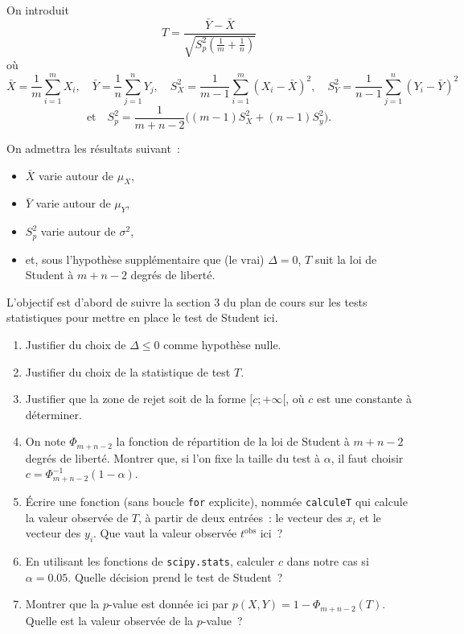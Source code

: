 \documentclass[a4paper,12pt,twosided]{article}
\newcommand{\ds}{\displaystyle}
\theoremstyle{definition}
\begin{document}
On introduit
\begin{equation}\label{eq:T}
  T = \frac{\ds \bar Y - \bar X}{\ds \sqrt{S_p^2\left(\frac1m+\frac1n\right)}}
\end{equation}
où
\[
  \bar X = \frac1m\sum_{i=1}^m X_i, \quad \bar Y = \frac1n \sum_{j=1}^n Y_j,
  \quad
  S_X^2 = \frac1{m-1}\sum_{i=1}^m (X_i- \bar X)^2, \quad S_Y^2 = \frac1{n-1}\sum_{j=1}^n (Y_i- \bar Y)^2
\]
\[
  \text{et} \quad S_p^2 = \frac{1}{m+n-2}\Big( (m-1)S_X^2 + (n-1)S_y^2 \Big).
\]

On admettra les résultats suivant~:
\begin{itemize}
\item $\bar X$ varie autour de $\mu_X$,
\item $\bar Y$ varie autour de $\mu_Y$,
\item $S_p^2$ varie autour de $\sigma^2$,
\item et, sous l'hypothèse supplémentaire que (le vrai) $\Delta =0$, $T$ suit la loi de Student à
  $m+n-2$ degrés de liberté. 
\end{itemize}

L'objectif est d'abord de suivre la section 3 du plan de cours sur les tests statistiques pour
mettre en place le test de Student ici.

\begin{enumerate}[\bf {1.}1.]
\item Justifier du choix de $\Delta\le 0$ comme hypothèse nulle.
\item Justifier du choix de la statistique de test $T$.
\item Justifier que la zone de rejet soit de la forme $[c;+\infty[$, où $c$ est une constante à
  déterminer.
\item On note $\Phi_{m+n-2}$ la fonction de répartition de la loi de Student à $m+n-2$ degrés de
  liberté. Montrer que, si l'on fixe la taille du test à $\alpha$, il faut choisir
  $c=\Phi_{m+n-2}^{-1}(1-\alpha)$.
\item Écrire une fonction (sans boucle \texttt{for} explicite), nommée \verb+calculeT+ qui calcule
  la valeur observée de $T$, à partir de deux entrées~: le vecteur des $x_i$ et le vecteur des
  $y_i$. Que vaut la valeur observée $t^\text{obs}$ ici~?
\item En utilisant les fonctions de \verb+scipy.stats+, calculer $c$ dans notre cas si
  $\alpha = 0.05$. Quelle décision prend le test de Student~?
\item Montrer que la $p$-value est donnée ici par $p(X,Y) = 1 - \Phi_{m+n-2}(T)$. Quelle est la
  valeur observée de la $p$-value~?
\end{enumerate}
\end{document}
